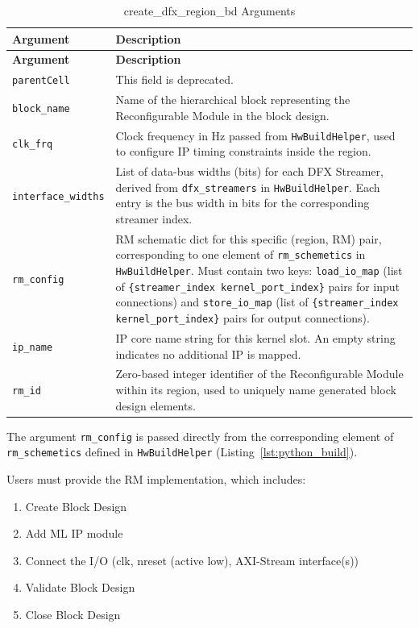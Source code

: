 \documentclass{cernatsnote}
\begin{document}
\begin{longtable}{|l|p{11cm}|}
\caption{create\_dfx\_region\_bd Arguments}
\label{tab:tcl_params} \\
\hline
\textbf{Argument} & \textbf{Description} \\
\hline
\endfirsthead
\hline
\textbf{Argument} & \textbf{Description} \\
\hline
\endhead
\hline
\endfoot
\texttt{parentCell} & This field is deprecated. \\
\hline
\texttt{block\_name} & Name of the hierarchical block representing the Reconfigurable Module in the block design. \\
\hline
\texttt{clk\_frq} & Clock frequency in Hz passed from \texttt{HwBuildHelper}, used to configure IP timing constraints inside the region. \\
\hline
\texttt{interface\_widths} & List of data-bus widths (bits) for each DFX Streamer, derived from \texttt{dfx\_streamers} in \texttt{HwBuildHelper}. Each entry is the bus width in bits for the corresponding streamer index. \\
\hline
\texttt{rm\_config} & RM schematic dict for this specific (region, RM) pair, corresponding to one element of \texttt{rm\_schemetics} in \texttt{HwBuildHelper}. Must contain two keys: \texttt{load\_io\_map} (list of \texttt{\{streamer\_index kernel\_port\_index\}} pairs for input connections) and \texttt{store\_io\_map} (list of \texttt{\{streamer\_index kernel\_port\_index\}} pairs for output connections). \\
\hline
\texttt{ip\_name} & IP core name string for this kernel slot. An empty string indicates no additional IP is mapped. \\
\hline
\texttt{rm\_id} & Zero-based integer identifier of the Reconfigurable Module within its region, used to uniquely name generated block design elements. \\
\hline
\end{longtable}


The argument \texttt{rm\_config} is passed directly from the corresponding element of \texttt{rm\_schemetics} defined in \texttt{HwBuildHelper} (Listing~\ref{lst:python_build}).

Users must provide the RM implementation, which includes:

\begin{enumerate}
  \item Create Block Design
  \item Add ML IP module
  \item Connect the I/O (clk, nreset (active low), AXI-Stream interface(s))
  \item Validate Block Design
  \item Close Block Design
\end{enumerate}
\end{document}
